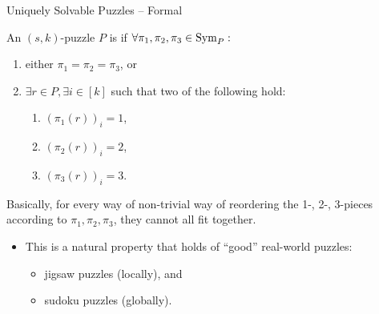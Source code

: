 \documentclass[t,10pt,
mathserif,xcolor=dvipsnames]{beamer}
\begin{document}
\begin{myframe}{Uniquely Solvable Puzzles -- Formal}
  
  \begin{definition}
    An $(s,k)$-puzzle $P$ is \emph{} if
    $\forall \pi_1, \pi_2, \pi_3 \in \mathrm{Sym}_{P}:$
    \begin{enumerate}
    \item either $\pi_1 = \pi_2 = \pi_3$, or
    \item $\exists r \in P, \exists i \in [k]$ such that  two
      of the following hold:
      \begin{enumerate}
      \item $(\pi_1(r))_i = 1$,
      \item $(\pi_2(r))_i = 2$,
      \item $(\pi_3(r))_i = 3$.
      \end{enumerate}
    \end{enumerate}
    
  \end{definition}

  Basically, for every way of non-trivial way of reordering the 1-,
  2-, 3-pieces according to $\pi_1, \pi_2, \pi_3$, they cannot all fit
  together.

  \begin{itemize}
  \item This is a natural property that holds of ``good'' real-world puzzles:
    \begin{itemize}
    \item jigsaw puzzles (locally), and
    \item sudoku puzzles (globally).
    \end{itemize}
  \end{itemize}
  
  
\end{myframe}
\end{document}
